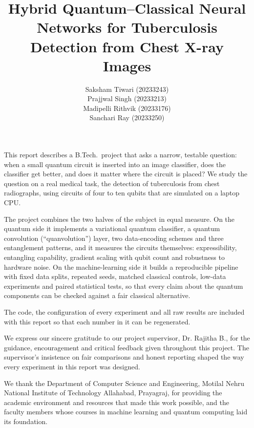 \documentclass{mnnit}
\begin{document}
\title{Hybrid Quantum--Classical Neural Networks for Tuberculosis Detection from Chest X-ray Images}
\author{Saksham Tiwari (20233243)\\
Prajjwal Singh (20233213)\\
Madipelli Rithvik (20233176)\\
Sanchari Ray (20233250)}

\figurespagetrue
\tablespagetrue
\beforepreface

This report describes a B.Tech.\ project that asks a narrow, testable
question: when a small quantum circuit is inserted into an image classifier,
does the classifier get better, and does it matter where the circuit is
placed? We study the question on a real medical task, the detection of
tuberculosis from chest radiographs, using circuits of four to ten qubits
that are simulated on a laptop CPU.

The project combines the two halves of the subject in equal measure. On the
quantum side it implements a variational quantum classifier, a quantum
convolution (``quanvolution'') layer, two data-encoding schemes and three
entanglement patterns, and it measures the circuits themselves:
expressibility, entangling capability, gradient scaling with qubit count and
robustness to hardware noise. On the machine-learning side it builds a
reproducible pipeline with fixed data splits, repeated seeds, matched
classical controls, low-data experiments and paired statistical tests, so
that every claim about the quantum components can be checked against a fair
classical alternative.

The code, the configuration of every experiment and all raw results are
included with this report so that each number in it can be regenerated.

We express our sincere gratitude to our project supervisor,
Dr. Rajitha B., for the guidance, encouragement and critical feedback
given throughout this project. The supervisor's insistence on fair
comparisons and honest reporting shaped the way every experiment in this
report was designed.

We thank the Department of Computer Science and Engineering, Motilal Nehru
National Institute of Technology Allahabad, Prayagraj, for providing the
academic environment and resources that made this work possible, and the
faculty members whose courses in machine learning and quantum computing
laid its foundation.
\end{document}
